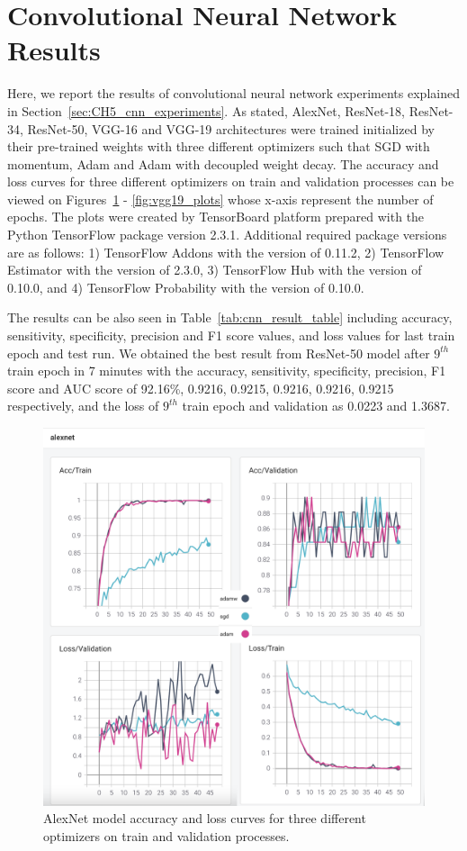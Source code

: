 \section{Convolutional Neural Network Results}

Here, we report the results of convolutional neural network experiments explained in Section~\ref{sec:CH5_cnn_experiments}. As stated, AlexNet, ResNet-18, ResNet-34, ResNet-50, VGG-16 and VGG-19 architectures were trained initialized by their pre-trained weights with three different optimizers such that SGD with momentum, Adam and Adam with decoupled weight decay. The accuracy and loss curves for three different optimizers on train and validation processes can be viewed on Figures~\ref{fig:alexnet_plots} - \ref{fig:vgg19_plots} whose x-axis represent the number of epochs. The plots were created by TensorBoard platform prepared with the Python TensorFlow package version 2.3.1. Additional required package versions are as follows: 1) TensorFlow Addons with the version of 0.11.2, 2) TensorFlow Estimator with the version of 2.3.0, 3) TensorFlow Hub with the version of 0.10.0, and 4) TensorFlow Probability with the version of 0.10.0.

The results can be also seen in Table~\ref{tab:cnn_result_table} including accuracy, sensitivity, specificity, precision and F1 score values, and loss values for last train epoch and test run. We obtained the best result from ResNet-50 model after $9^{th}$ train epoch in 7 minutes with the accuracy, sensitivity, specificity, precision, F1 score and AUC score of 92.16\%, 0.9216, 0.9215, 0.9216, 0.9216, 0.9215 respectively, and the loss of $9^{th}$ train epoch and validation as 0.0223 and 1.3687.

\begin{figure}[!h]
	\centering
	\includegraphics[width=\linewidth]{fig/alexnet.png}
	\vspace{2mm}
	\caption{AlexNet model accuracy and loss curves for three different optimizers on train and validation processes.}
	\label{fig:alexnet_plots}
\end{figure}

